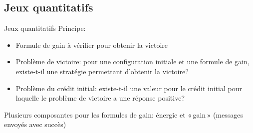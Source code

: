 \documentclass[aspectratio=43]{beamer} %
\begin{document}
\subsection{Jeux quantitatifs}
\begin{frame}{Jeux quantitatifs}
  \small
  Principe:
  \begin{itemize}
    \item \alert{Formule de gain} à vérifier pour obtenir la victoire
    \item Problème de victoire: pour une configuration initiale et une formule de gain, existe-t-il une stratégie permettant d'obtenir la victoire?
    \item Problème du crédit initial: existe-t-il une valeur pour le crédit initial pour laquelle le problème de victoire a une réponse positive?
  \end{itemize}
  Plusieurs composantes pour les formules de gain: \alert{énergie et «\,gain\,»} (messages envoyés avec succès)
\end{frame}
\newcommand\idle         {\textsf{repos}\xspace}
\newcommand\listen       {\textsf{écoute}\xspace}
\newcommand\treatmsg     {\textsf{trait\_msg}\xspace}
\newcommand\treatnlmsg   {\textsf{trait}\\\textsf{msg}\xspace}
\newcommand\send         {\textsf{envoi}\xspace}
\newcommand\resend       {\textsf{renvoi}\xspace}
\newcommand\startsend    {\textsf{déb\_envoi}\xspace}
\newcommand\stopsend     {\textsf{fin\_envoi}\xspace}
\newcommand\startlisten  {\textsf{déb\_écoute}\xspace}
\newcommand\srlisten     {\textsf{déb\_éc.}\xspace}
\newcommand\stoplisten   {\textsf{fin\_écoute}\xspace}
\newcommand\startreceive {\textsf{déb\_réception}\xspace}
\newcommand\starttransmit{\textsf{déb\_retransmission}\xspace}
\newcommand\hold         {\textsf{attente}\xspace}
\newcommand\remainidle   {\textsf{cont\_repos}\xspace}
\newcommand\ignore       {\textsf{ignorer\_msg}\xspace}
\newcommand\gn           {{\ensuremath{\mathfrak{s}}}\xspace}
\newcommand\bn           {{\ensuremath{\mathfrak{c}}}\xspace}
\newcommand\chapterLACLbis{85,152,211}
\definecolor{chapterLACL}{RGB}{\chapterLACLbis}
\end{document}

